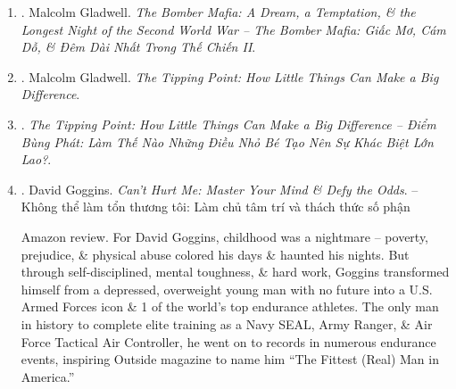\documentclass{article}
\begin{document}
\begin{enumerate}
	\item \cite{Gladwell_bomber_mafia}. Malcolm Gladwell. {\it The Bomber Mafia: A Dream, a Temptation, \& the Longest Night of the Second World War -- The Bomber Mafia: Giấc Mơ, Cám Dỗ, \& Đêm Dài Nhất Trong Thế Chiến II}.\hfill{\sf[done]}
	
	\item \cite{Gladwell2022}. Malcolm Gladwell. {\it The Tipping Point: How Little Things Can Make a Big Difference}.\hfill{\sf[reading]}
	
	\item \cite{Gladwell_tipping_point}. {\it The Tipping Point: How Little Things Can Make a Big Difference -- Điểm Bùng Phát: Làm Thế Nào Những Điều Nhỏ Bé Tạo Nên Sự Khác Biệt Lớn Lao?}.\hfill{\sf[done]}
	
	\item \cite{Goggins_hurt}. {\sc David Goggins}. {\it Can't Hurt Me: Master Your Mind \& Defy the Odds}. -- Không thể làm tổn thương tôi: Làm chủ tâm trí và thách thức số phận {}
	
	{\sf Amazon review.} For {\sc David Goggins}, childhood was a nightmare -- poverty, prejudice, \& physical abuse colored his days \& haunted his nights. But through self-disciplined, mental toughness, \& hard work, {\sc Goggins} transformed himself from a depressed, overweight young man with no future into a U.S. Armed Forces icon \& 1 of the world's top endurance athletes. The only man in history to complete elite training as a Navy SEAL, Army Ranger, \& Air Force Tactical Air Controller, he went on to records in numerous endurance events, inspiring Outside magazine to name him ``The Fittest (Real) Man in America.''
	

\end{enumerate}
\end{document}

